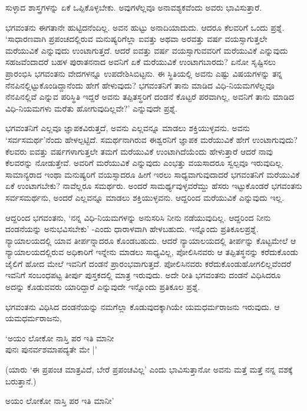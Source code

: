 ಸುಳ್ಳಾದ ಶಾಸ್ತ್ರಗಳನ್ನು ಏಕೆ ಒಪ್ಪಿಕೊಳ್ಳಬೇಕು. ಅವುಗಳೆಲ್ಲವೂ ಅನಾವಶ್ಯಕವೆಂದು ಅವರು ಭಾವಿಸುತ್ತಾರೆ.

ಭಗವಂತನು ಈಗತಾನೇ ಹುಟ್ಟಿದನೆಂದಿಲ್ಲ. ಅವನ ಹುಟ್ಟು ಅನಾದಿಯಾದುದು. ಆದರೂ ಕೆಲವರಿಗೆ ಒಂದು ಪ್ರಶ್ನೆ. `ಸಾಧಾರಣವಾಗಿ ಪ್ರಪಂಚದಲ್ಲಿರುವ ಮನುಷ್ಯರಿಗೆಲ್ಲಾ ಐವತ್ತು ಅಥವಾ ಅರವತ್ತು ವರ್ಷ ವಯಸ್ಸಾಗುತ್ತಲೇ ಮರೆಯುವಿಕೆ ಎನ್ನುವುದು ಉಂಟಾಗುತ್ತದೆ. ಆದರೆ ಐವತ್ತು ವರ್ಷ ವಯಸ್ಸಾಗುವವರಿಗೆ ಮರೆಯುವಿಕೆ ಎನ್ನುವುದು ಸಹಜವೆಂದಾದರೆ ಬಹಳ ಪುರಾತನನಾದ ಅವನಿಗೆ ಏಕೆ ಮರೆಯುವಿಕೆ ಉಂಟಾಗಬಾರದು? ಏನೋ ಸೃಷ್ಟಿಸಲು ಪ್ರಾರಂಭಿಸಿ ಭಗವಂತನು ವೇದಗಳನ್ನೂ ಉಪದೇಶಿಸಿಬಿಟ್ಟನು. ಈ ಸ್ಥಿತಿಯಲ್ಲಿ ಅವನು ಎಷ್ಟು ವಿಷಯಗಳನ್ನು ತನ್ನ ನೆನಪಿನಲ್ಲಿಟ್ಟುಕೊಂಡಿದ್ದಾನೆಂದು ಹೇಗೆ ಹೇಳುವುದು? ಭಗವಂತನಿಗೆ ತಾನು ಮಾಡಿದ ವಿಧಿ-ನಿಯಮಗಳೆಲ್ಲವೂ ನೆನಪಿನಲ್ಲಿವೆ ಎನ್ನುವ ಪರಿಸ್ಥಿತಿ ಇದ್ದರೆ ಅವನು ತಪ್ಪಿತಸ್ಥರಿಗೆ ದಂಡನೆ ಕೊಟ್ಟರೆ ಪರವಾಗಿಲ್ಲ, ಅವನಿಗೆ ತಾನು ಮಾಡಿದ ವಿಧಿ-ನಿಯಮಗಳು ಮರೆತು ಹೋಗುವುದಿಲ್ಲವೇ?' ಎನ್ನುವುದೇ ಪ್ರಶ್ನೆ.

ಭಗವಂತನಿಗೆ ಎಲ್ಲವೂ ಜ್ಞಾಪಕವಿರುತ್ತದೆ, ಅವನು ಎಲ್ಲವನ್ನೂ ಮಾಡಲು ಶಕ್ತಿಯುಳ್ಳವನು. ಅವನು `ಸರ್ವಸಮರ್ಥ'ನೆಂದು ಹೇಳಲ್ಪಟ್ಟಿದೆ. ಸಮರ್ಥನಾಗಿರುವ ಈಶ್ವರನಿಗೆ ಜ್ಞಾಪಕ ಮರೆಯುವಿಕೆ ಹೇಗೆ ಉಂಟಾಗುವುದು? ಕೆಲವರು ಐವತ್ತು ವರ್ಷಗಳಾಗುತ್ತಲೇ ತಮಗೆ ಮರೆಯುವಿಕೆ ಉಂಟಾಗಿದೆಯೆಂದು ಹೇಳುತ್ತಾರೆ ಆದರೆ ನಾವು ಕೆಲವರನ್ನು ನೋಡುತ್ತೇವೆ. ಅವರಿಗೆ ಮರೆಯುವಿಕೆ ಎನ್ನುವುದು ಎಂಭತ್ತು ವಯಸಾದರೂ ಸ್ವಲ್ಪವೂ ಇರುವುದಿಲ್ಲ. ಸಾಮಾನ್ಯರಾದ ಇಂಥಾ ಮನುಷ್ಯರಿಗೆ ವಯಸ್ಸಾದರೂ ಹೀಗೆ ಇರಲು ಸಾಧ್ಯವಾಗುವುದಾದರೆ ಭಗವಂತನಿಗೆ ಮರೆಯುವಿಕೆ ಏಕೆ ಉಂಟಾಗಬೇಕು? ನಾವೆಲ್ಲರೂ ಸಮರ್ಥರು. ಅಂದರೆ ಸಾಮರ್ಥ್ಯವುಳ್ಳವರೆಮ್ದು ಹೆಸರು ಇಟ್ಟುಕೊಂಡರೆ ಭಗವಂತನು ಸರ್ವಸಮರ್ಥನು, ಅಂದರೆ ಎಲ್ಲವನ್ನೂ ಮಾಡಲು ಶಕ್ತಿಯುಳ್ಳವನು. ಆದ್ದರಿಂದ ಮರೆಯುವಿಕೆ ಎನ್ನುವುದು ಇಲ್ಲ.

ಆದ್ದರಿಂದ ಭಗವಂತನು, `ನನ್ನ ವಿಧಿ-ನಿಯಮಗಳನ್ನು ಅನುಸರಿಸಿ ನೀನು ನಡೆಯುವುದಿಲ್ಲ. ಆದ್ದರಿಂದ ನೀನು ದಂಡನೆಯನ್ನು ಅನುಭವಿಸಬೇಕು' -ಎಂದು ಧಾರಾಳವಾಗಿ ಹೇಳಬಹುದು. ಇನ್ನೊಂದು ಪ್ರತಿಕೂಲಪ್ರಶ್ನೆ. ನ್ಯಾಯಾಲಯದಲ್ಲಿ ಯಾವ ತೀರ್ಪನ್ನಾದರೂ ಕೊಂಡಬಹುದು. ಆದರೆ ನ್ಯಾಯಾಲಯದಲ್ಲಿ ತೀರ್ಪನ್ನು ಕೊಟ್ಟಮೇಲೆ ಆ ನ್ಯಾಯಾಲಯದಲ್ಲಿರುವ ಅಧಿಕಾರಿಗೆ ಇನ್ನೇನು ಮಾಡಲು ಸಾಧ್ಯವಿಲ್ಲ, ಪೋಲಿಸಿನವರು ಆ ತಪ್ಪಿತಸ್ಥನನ್ನು ಕರೆದುಕೊಂಡು ಜೈಲಿಗೆ ಹೋದ ಮೇಲೆ ಇವನಿಗೆ ದಂಡನೆ ಪ್ರಾರಂಭವಾಗುತ್ತದೆ. ಪೋಲಿಸಿನವರು ಕರೆದುಕೊಂಡುಹೋಗಲಿಲ್ಲವೆಂದರೆ ಇವನಿಗೆ ಸಂಬಂಧಪಟ್ಟ ತೀರ್ಪು ಪುಸ್ತಕದಲ್ಲಿ ಮಾತ್ರ ಇರುವುದು. ಅದೇ ರೀತಿ ಭಗವಂತನು ದಂಡನೆ ವಿಧಿಸಿದರೂ ಅದನ್ನು ಕೊಡುವವರು ಯಾರಿದ್ದಾರೆ ಎನ್ನುವುದೇ ಇನ್ನೊಂದು ಪ್ರತಿಕೂಲ ಪ್ರಶ್ನೆ.

ಭಗವಂತನು ವಿಧಿಸಿದ ದಂಡನೆಯನ್ನು ನಮಗೆಲ್ಲಾ ಕೊಡುವುದಕ್ಕಾಗಿಯೇ ಯಮಧರ್ಮರಾಜನು ಇರುವುದು. ಆ ಯಮಧರ್ಮರಾಜನು,

\begin{shloka}
`ಅಯಂ ಲೋಕೋ ನಾಸ್ತಿ ಪರ ಇತಿ ಮಾನೀ\\
ಪುನಃ ಪುನರ್ವಶಮಾಪದ್ಯತೇ ಮೇ |'
\end{shloka}

(ಯಾರು `ಈ ಪ್ರಪಂಚ ಮಾತ್ರವಿದೆ, ಬೇರೆ ಪ್ರಪಂಚವಿಲ್ಲ' ಎಂದು ಭಾವಿಸುತ್ತಾನೋ ಅವನು ಮತ್ತೆ ಮತ್ತೆ ನನ್ನ ವಶಕ್ಕೆ ಬರುತ್ತಾನೆ.)

\begin{shloka}
ಅಯಂ ಲೋಕೋ ನಾಸ್ತಿ ಪರ ಇತಿ ಮಾನೀ'
\end{shloka}

